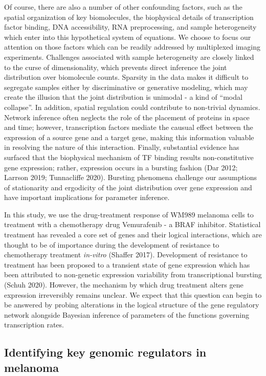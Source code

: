 \documentclass{article}
\begin{document}
Of course, there are also a number of other confounding factors, such as the spatial organization of key biomolecules, the biophysical details of transcription factor binding, DNA accessibility, RNA preprocessing, and sample heterogeneity which enter into this hypothetical system of equations. We choose to focus our attention on those factors which can be readily addressed by multiplexed imaging experiments. Challenges associated with sample heterogeneity are closely linked to the curse of dimensionality, which prevents direct inference the joint distribution over biomolecule counts. Sparsity in the data makes it difficult to segregate samples either by discriminative or generative modeling, which may create the illusion that the joint distribution is unimodal - a kind of ``modal collapse''. In addition, spatial regulation could contribute to non-trivial dynamics. Network inference often neglects the role of the placement of proteins in space and time; however, transcription factors mediate the causual effect between the expression of a source gene and a target gene, making this information valuable in resolving the nature of this interaction. Finally, substantial evidence has surfaced that the biophysical mechanism of TF binding results non-constitutive gene expression; rather, expression occurs in a bursting fashion (Dar 2012; Larrson 2019; Tunnacliffe 2020). Bursting phenomena challenge our assumptions of stationarity and ergodicity of the joint distribution over gene expression and have important implications for parameter inference.

In this study, we use the drug-treatment response of WM989 melanoma cells to treatment with a chemotherapy drug Vemurafenib - a BRAF inhibitor. Statistical treatment has revealed a core set of genes and their logical interactions, which are thought to be of importance during the development of resistance to chemotherapy treatment \emph{in-vitro} (Shaffer 2017). Development of resistance to treatment has been proposed to a transient state of gene expression which has been attributed to non-genetic expression variability from transcriptional bursting (Schuh 2020). However, the mechanism by which drug treatment alters gene expression irreversibly remains unclear. We expect that this question can begin to be answered by probing alterations in the logical structure of the gene regulatory network alongside Bayesian inference of parameters of the functions governing transcription rates.

\subsection{Identifying key genomic regulators in melanoma}
\end{document}
